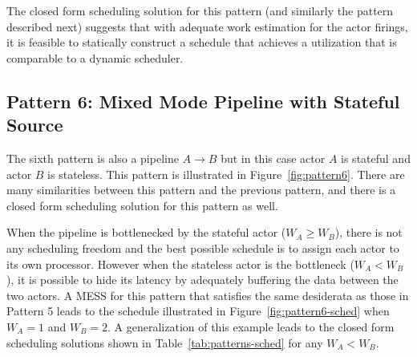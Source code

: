 The closed form scheduling solution for this pattern (and similarly
the pattern described next) suggests that with adequate work
estimation for the actor firings, it is feasible to statically
construct a schedule that achieves a utilization that is comparable to
a dynamic scheduler.

\subsection{Pattern 6: Mixed Mode Pipeline with Stateful Source}

The sixth pattern is also a pipeline $A\rightarrow B$ but in this case
actor $A$ is stateful and actor $B$ is stateless. This pattern is
illustrated in Figure~\ref{fig:pattern6}. There are many similarities
between this pattern and the previous pattern, and there is a closed
form scheduling solution for this pattern as well. 

When the pipeline is bottlenecked by the stateful actor ($W_A \ge
W_B$), there is not any scheduling freedom and the best possible
schedule is to assign each actor to its own processor. However when
the stateless actor is the bottleneck ($W_A < W_B$), it is possible to
hide its latency by adequately buffering the data between the two
actors. A MESS for this pattern that satisfies the same desiderata as
those in Pattern 5 leads to the schedule illustrated in
Figure~\ref{fig:pattern6-sched} when $W_A = 1$ and $W_B = 2$.  A
generalization of this example leads to the closed form scheduling
solutions shown in Table~\ref{tab:patterns-sched} for any $W_A < W_B$.
